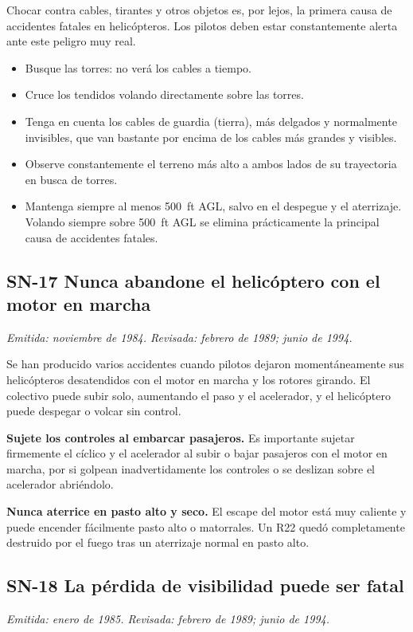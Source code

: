 Chocar contra cables, tirantes y otros objetos es, por lejos, la primera causa de accidentes fatales en helicópteros. Los pilotos deben estar constantemente alerta ante este peligro muy real.

\begin{itemize}
\item Busque las torres: no verá los cables a tiempo.
\item Cruce los tendidos volando directamente sobre las torres.
\item Tenga en cuenta los cables de guardia (tierra), más delgados y normalmente invisibles, que van bastante por encima de los cables más grandes y visibles.
\item Observe constantemente el terreno más alto a ambos lados de su trayectoria en busca de torres.
\item Mantenga siempre al menos 500~ft AGL, salvo en el despegue y el aterrizaje. Volando siempre sobre 500~ft AGL se elimina prácticamente la principal causa de accidentes fatales.
\end{itemize}

\subsection*{SN-17 \quad Nunca abandone el helicóptero con el motor en marcha}
{\small\textit{Emitida: noviembre de 1984. Revisada: febrero de 1989; junio de 1994.}}

Se han producido varios accidentes cuando pilotos dejaron momentáneamente sus helicópteros desatendidos con el motor en marcha y los rotores girando. El colectivo puede subir solo, aumentando el paso y el acelerador, y el helicóptero puede despegar o volcar sin control.

\textbf{Sujete los controles al embarcar pasajeros.} Es importante sujetar firmemente el cíclico y el acelerador al subir o bajar pasajeros con el motor en marcha, por si golpean inadvertidamente los controles o se deslizan sobre el acelerador abriéndolo.

\textbf{Nunca aterrice en pasto alto y seco.} El escape del motor está muy caliente y puede encender fácilmente pasto alto o matorrales. Un R22 quedó completamente destruido por el fuego tras un aterrizaje normal en pasto alto.

\subsection*{SN-18 \quad La pérdida de visibilidad puede ser fatal}
{\small\textit{Emitida: enero de 1985. Revisada: febrero de 1989; junio de 1994.}}

